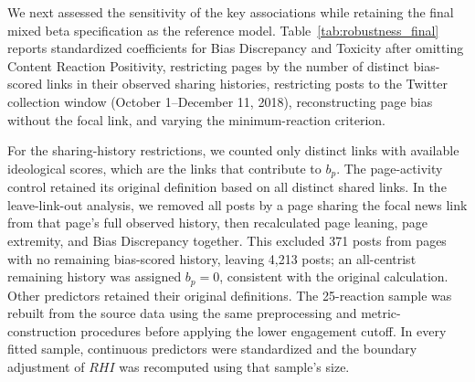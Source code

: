 We next assessed the sensitivity of the key associations while retaining
the final mixed beta specification as the reference model.
Table~\ref{tab:robustness_final} reports standardized coefficients for Bias
Discrepancy and Toxicity after omitting Content Reaction Positivity,
restricting pages by the number of distinct bias-scored links in their
observed sharing histories, restricting posts to the Twitter collection
window (October 1--December 11, 2018), reconstructing page bias without the
focal link, and varying the minimum-reaction criterion.

For the sharing-history restrictions, we counted only distinct links with
available ideological scores, which are the links that contribute to $b_p$.
The page-activity control retained its original definition based on all
distinct shared links. In the leave-link-out analysis, we removed all posts
by a page sharing the focal news link from that page's full observed history,
then recalculated page leaning, page extremity, and Bias Discrepancy together.
This excluded 371 posts from pages with no remaining bias-scored history,
leaving 4,213 posts; an all-centrist remaining history was assigned $b_p=0$,
consistent with the original calculation. Other predictors retained their
original definitions. The 25-reaction sample was rebuilt from the source
data using the same preprocessing and metric-construction procedures before
applying the lower engagement cutoff. In every fitted sample, continuous
predictors were standardized and the boundary adjustment of $RHI$ was
recomputed using that sample's size.

